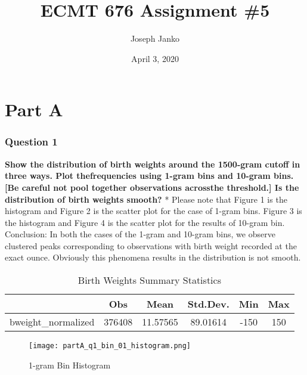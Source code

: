 \documentclass{article}
\title{ECMT 676 Assignment \#5 }
\author{Joseph Janko}
\date{April 3, 2020}
\begin{document}
\maketitle

\part*{Part A}

\section*{Question 1}

\textbf{Show  the  distribution  of  birth  weights  around  the  1500-gram  cutoff  in  three  ways.   Plot  thefrequencies using 1-gram bins and 10-gram bins.  [Be careful not pool together observations acrossthe threshold.]
Is the distribution of birth weights smooth?}
\newline \newline
* Please note that Figure 1 is the histogram and Figure 2 is the scatter plot for the case of 1-gram bins. Figure 3 is the histogram and Figure 4 is the scatter plot for the results of 10-gram bin.
\newline
\newline
Conclusion: In both the cases of the 1-gram and 10-gram bins, we observe clustered peaks corresponding to observations with birth weight recorded at the exact ounce. Obviously this phenomena results in the distribution is not smooth.

\begin{table}[H]\centering
\def\sym#1{\ifmmode^{#1}\else\(^{#1}\)\fi}
\caption{Birth Weights Summary Statistics}
\begin{tabular}{l*{1}{ccccc}}
\hline\hline
            &         Obs&        Mean&    Std.Dev.&         Min&         Max\\
\hline
bweight\_normalized&      376408&    11.57565&    89.01614&        -150&         150\\
\hline\hline
\end{tabular}
\end{table}

\begin{figure}[H]
\begin{center}
\texttt{[image: partA\_q1\_bin\_01\_histogram.png]}
\end{center}
\caption{1-gram Bin Histogram}
\label{fig:figure1}
\end{figure}
\end{document}
